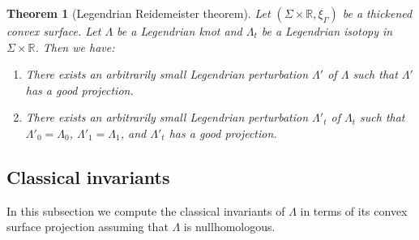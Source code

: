 \documentclass[11pt]{amsart}
\theoremstyle{mystyle}
\newtheorem{definition}{Definition}[section]
\newtheorem{theorem}[theorem]{Theorem}
\newtheorem{lemma}[lemma]{Lemma}
\newcommand{\R}{\mathbb{R}}
\newcommand{\de}{\text{d}}
\newcommand{\<}{\langle}
\renewcommand{\>}{\rangle}
\begin{document}
\begin{theorem}[Legendrian Reidemeister theorem]\vphantom{} \it
Let $(\Sigma \times \R, \xi_\Gamma)$ be a thickened convex surface. Let $\Lambda$ be a Legendrian knot and $\Lambda_t$ be a Legendrian isotopy in $\Sigma \times \R$. Then we have:
\begin{enumerate}[label=(\alph*)]
    \item There exists an arbitrarily small Legendrian perturbation $\Lambda'$ of $\Lambda$ such that $\Lambda'$ has a good projection.
    \item There exists an arbitrarily small Legendrian perturbation $\Lambda'_t$ of $\Lambda_t$ such that $\Lambda'_0 = \Lambda_0$, $\Lambda'_1 = \Lambda_1$, and $\Lambda'_t$ has a good projection.
\end{enumerate}
\end{theorem}




\subsection{Classical invariants}

In this subsection we compute the classical invariants of $\Lambda$ in terms of its convex surface projection assuming that $\Lambda$ is nullhomologous.
\end{document}
